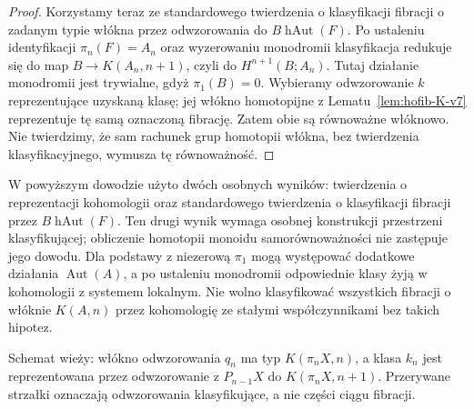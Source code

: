 \begin{proof}
Korzystamy teraz ze standardowego twierdzenia o
klasyfikacji fibracji o zadanym typie włókna przez
odwzorowania do $B\operatorname{hAut}(F)$. Po ustaleniu
identyfikacji $\pi_n(F)=A_n$ oraz wyzerowaniu
monodromii klasyfikacja redukuje się do map
$B\to K(A_n,n+1)$, czyli do
$H^{n+1}(B;A_n)$. Tutaj działanie monodromii
jest trywialne, gdyż $\pi_1(B)=0$.
Wybieramy odwzorowanie $k$ reprezentujące uzyskaną
klasę; jej włókno homotopijne z
Lematu~\ref{lem:hofib-K-v7} reprezentuje tę
samą oznaczoną fibrację. Zatem obie są
równoważne włóknowo. Nie twierdzimy, że sam
rachunek grup homotopii włókna, bez twierdzenia
klasyfikacyjnego, wymusza tę równoważność.
\end{proof}

\begin{uwaga}
W powyższym dowodzie użyto dwóch osobnych wyników:
twierdzenia o reprezentacji kohomologii oraz
standardowego twierdzenia o klasyfikacji fibracji
przez $B\operatorname{hAut}(F)$. Ten drugi wynik
wymaga osobnej konstrukcji przestrzeni klasyfikującej;
obliczenie homotopii monoidu samorównoważności
nie zastępuje jego dowodu. Dla podstawy z niezerową
$\pi_1$ mogą występować dodatkowe działania
$\operatorname{Aut}(A)$, a po ustaleniu monodromii
odpowiednie klasy żyją w kohomologii z systemem
lokalnym. Nie wolno klasyfikować wszystkich fibracji
o włóknie $K(A,n)$ przez kohomologię ze stałymi
współczynnikami bez takich hipotez.
\end{uwaga}

\begin{center}
\end{center}
\noindent Schemat wieży: włókno odwzorowania $q_n$ ma typ $K(\pi_nX,n)$,
a klasa $k_n$ jest reprezentowana przez odwzorowanie z $P_{n-1}X$
do $K(\pi_nX,n+1)$. Przerywane strzałki oznaczają
odwzorowania klasyfikujące, a nie części ciągu fibracji.

